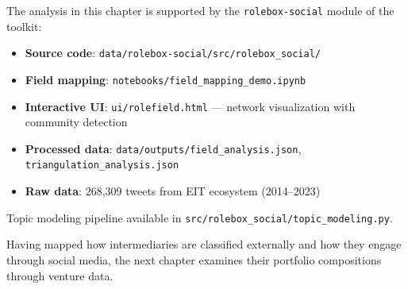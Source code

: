 \documentclass[../main.tex]{subfiles}
\begin{document}
\vspace{0.5em}
\begin{replicationbox}
The analysis in this chapter is supported by the \texttt{rolebox-social} module of the \RoleBox{} toolkit:
\begin{itemize}[leftmargin=*, itemsep=0.2em]
\item \textbf{Source code}: \texttt{data/rolebox-social/src/rolebox\_social/}
\item \textbf{Field mapping}: \texttt{notebooks/field\_mapping\_demo.ipynb}
\item \textbf{Interactive UI}: \texttt{ui/rolefield.html} --- network visualization with community detection
\item \textbf{Processed data}: \texttt{data/outputs/field\_analysis.json}, \texttt{triangulation\_analysis.json}
\item \textbf{Raw data}: 268,309 tweets from EIT ecosystem (2014--2023)
\end{itemize}
Topic modeling pipeline available in \texttt{src/rolebox\_social/topic\_modeling.py}.
\end{replicationbox}

\vspace{1em}
Having mapped how intermediaries are classified externally and how they engage through social media, the next chapter examines their portfolio compositions through venture data.
\end{document}

